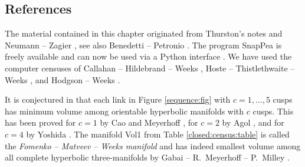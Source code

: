 \subsection{References}
The material contained in this chapter originated from Thurston's notes \cite{Th} and Neumann -- Zagier \cite{NZ}, see also Benedetti -- Petronio \cite{BP}. The program SnapPea is freely available and can now be used via a Python interface \cite{Sna}. We have used the computer censuses of Callahan -- Hildebrand -- Weeks \cite{CaHiWe}, Hoste -- Thistlethwaite -- Weeks \cite{HTW}, and Hodgson -- Weeks \cite{Ho-We}.

It is conjectured in \cite{A} that each link in Figure \ref{sequence:fig} with $c=1,\ldots, 5$ cusps has minimum volume among orientable hyperbolic manifolds with $c$ cusps. This has been proved for $c=1$ by Cao and Meyerhoff \cite{CM}, for $c=2$ by Agol \cite{A}, and for $c=4$ by Yoshida \cite{Yo}. The manifold Vol1 from Table \ref{closed:census:table} is called the \emph{Fomenko -- Matveev -- Weeks manifold} and has indeed smallest volume among all complete hyperbolic three-manifolds by Gabai -- R.~Meyerhoff -- P.~Milley \cite{GMM}.

